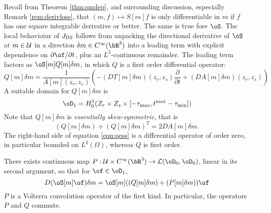Recall from Theorem \ref{thm:smdep}, and surrounding discussion,
especially Remark \ref{rem:derivloss}, that $(m,f) \mapsto S[m]f$ is
only differentiable in $m$ if $f$ has one square integrable derivative
or better. The same is true fore $\oS$. The local
behavioiur of $J_{\rm DS}$ follows from unpacking the directional derivative of
$\oS$ at $m \in {\cal U}$ in a direction $\delta m \in
C^{\infty}(\bR^3)$ into a leading term with explicit dependence on $\partial
\of/ \partial t$, plus an $L^2$-continuous remainder.
The leading term factors as $\oS[m]Q[m]\delta m$, in which $Q$ is a
first order differential operator:
\begin{equation}
\label{eqn:qdef}
Q[m]\delta m =\frac{1}{A[m](z_r,z_s)}\left(-(DT[m]\delta
m) (z_r,z_s)\frac{\partial}{\partial t} + (D A[m]\delta m)(z_r,z_s)\right)
\end{equation}
A suitable domain for $Q[m]\delta m$ is
\begin{equation}
\label{eqn:d1def}
\oD_1 = H^1_0(Z_r \times Z_s \times [-\tau_{\rm max},t^{\rm
  max}-\tau_{\rm min}])
\end{equation}
Note that $Q[m]\delta m$ is {\em essentially skew-symmetric}, that is
\begin{equation}
\label{eqn:qess}
(Q[m]\delta m) + (Q[m]\delta m)^T =2 DA[m]\delta m.
\end{equation}
The right-hand side of equation \ref{eqn:qess} is a differential
operator of order zero, in particular bounded on $L^2(\Omega)$,
whereas $Q$ is first order.
\begin{theorem}
\label{thm:q}
There exists continuous map $P: {\cal U} \times C^{\infty}(\bR^3)
\rightarrow {\cal L}(\oD_0,\oD_0)$, linear in its second argument, 
so that for $\of \in \oD_1$,
\begin{equation}
\label{eqn:paramderiv}
D(\oS[m]\of)\delta m = \oS[m]((Q[m]\delta m) + (P[m]\delta
m))\of
\end{equation}
$P$ is a Volterra convolution operator of the first kind. In
particular, the operators $P$ and $Q$ commute.
\end{theorem}
